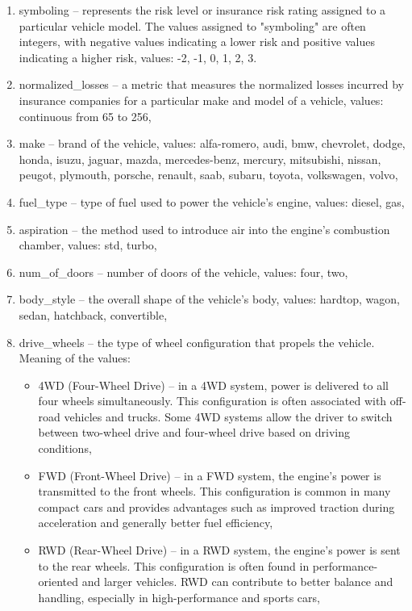 \documentclass[11pt,a4paper]{article}\usepackage[]{graphicx}\usepackage[]{xcolor}
\begin{document}
	\begin{enumerate}
  \item symboling -- represents the risk level or insurance risk rating assigned to a particular vehicle model. The values assigned to "symboling" are often integers, with negative values indicating a lower risk and positive values indicating a higher risk, values: -2, -1, 0, 1, 2, 3.
  \item normalized\_losses -- a metric that measures the normalized losses incurred by insurance companies for a particular make and model of a vehicle, values: continuous from 65 to 256,
 
	 \item make -- brand of the vehicle, values: alfa-romero, audi, bmw, chevrolet, dodge, honda, isuzu, jaguar, mazda, mercedes-benz, mercury, mitsubishi, nissan, peugot, plymouth, porsche, renault, saab, subaru, toyota, volkswagen, volvo,

  \item  fuel\_type -- type of fuel used to power the vehicle's engine, values: diesel, gas,
  \item  aspiration --  the method used to introduce air into the engine's combustion chamber, values: std, turbo,
  \item num\_of\_doors -- number of doors of the vehicle, values: four, two,
  \item body\_style -- the overall shape of the vehicle's body, values: hardtop, wagon, sedan, hatchback, convertible,
  
  
  \item drive\_wheels -- the type of wheel configuration that propels the vehicle. Meaning of the values:
  \begin{itemize}
  \item 4WD (Four-Wheel Drive) -- in a 4WD system, power is delivered to all four wheels simultaneously. This configuration is often associated with off-road vehicles and trucks. Some 4WD systems allow the driver to switch between two-wheel drive and four-wheel drive based on driving conditions,

\item FWD (Front-Wheel Drive) -- in a FWD system, the engine's power is transmitted to the front wheels. This configuration is common in many compact cars and provides advantages such as improved traction during acceleration and generally better fuel efficiency,

\item RWD (Rear-Wheel Drive) -- in a RWD system, the engine's power is sent to the rear wheels. This configuration is often found in performance-oriented and larger vehicles. RWD can contribute to better balance and handling, especially in high-performance and sports cars,
  

\end{itemize}
\end{enumerate}
\end{document}
